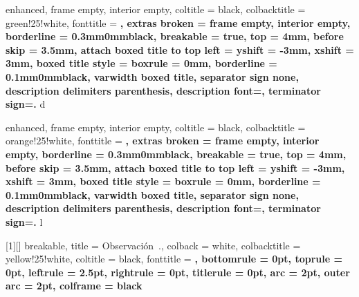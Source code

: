{
    enhanced,
    frame empty,
    interior empty,
    coltitle = black,
    colbacktitle = green!25!white,
    fonttitle = \bfseries,
    extras broken = {frame empty, interior empty},
    borderline = {0.3mm}{0mm}{black},
    breakable = true,
    top = 4mm,
    before skip = 3.5mm,
    attach boxed title to top left = {yshift = -3mm, xshift = 3mm},
    boxed title style = {boxrule = 0mm, borderline = {0.1mm}{0mm}{black}},
    varwidth boxed title,
    separator sign none, description delimiters parenthesis,
    description font=\bfseries,
    terminator sign={.\hspace{1mm}}
}
{d}

{
    enhanced,
    frame empty,
    interior empty,
    coltitle = black,
    colbacktitle = orange!25!white,
    fonttitle = \bfseries,
    extras broken = {frame empty, interior empty},
    borderline = {0.3mm}{0mm}{black},
    breakable = true,
    top = 4mm,
    before skip = 3.5mm,
    attach boxed title to top left = {yshift = -3mm, xshift = 3mm},
    boxed title style = {boxrule = 0mm, borderline = {0.1mm}{0mm}{black}},
    varwidth boxed title,
    separator sign none, description delimiters parenthesis,
    description font=\bfseries,
    terminator sign={.\hspace{1mm}}
}
{l}

[1][]
{
    breakable,
    title = Observación~\thetcbcounter.,
    colback = white,
    colbacktitle = yellow!25!white,
    coltitle = black,
    fonttitle = \bfseries,
    bottomrule = 0pt,
    toprule = 0pt,
    leftrule = 2.5pt,
    rightrule = 0pt,
    titlerule = 0pt,
    arc = 2pt,
    outer arc = 2pt,
    colframe = black
}




\newenvironment{section-problem.tcb}
{
    \begin{tcb-problem-style}{}{}
    }{
    \end{tcb-problem-style}
}
